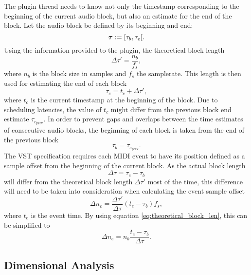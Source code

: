 The plugin thread needs to know not only
the timestamp corresponding to the beginning of the current audio block,
but also an estimate for the end of the block.
Let the audio block be defined by its beginning and end:
\[
\boldsymbol{\tau} := [\tau_b, \tau_e[.
\]
Using the information provided to the plugin,
the theoretical block length
\begin{equation}
\label{eq:theoretical_block_len}
\Delta \tau' = \frac{n_b}{f_s},
\end{equation}
where $n_b$ is the block size in samples and $f_s$ the samplerate.
This length is then used for estimating the end of each block
\begin{equation}
\tau_e = t_c + \Delta \tau',
\end{equation}
where $t_c$ is the current timestamp at the beginning of the block.
Due to scheduling latencies,
the value of $t_c$ might differ from the
previous block end estimate $\tau_{e_{\mathrm{prev}}}$.
In order to prevent gaps and overlaps between the
time estimates of consecutive audio blocks,
the beginning of each block is taken from the end of the previous block
\begin{equation}
\tau_b = \tau_{e_{\mathrm{prev}}}.
\end{equation}
The VST specification requires
each MIDI event to have its position defined
as a sample offset from the beginning of the current block.
As the actual block length
\begin{equation}
\Delta \tau = \tau_e - \tau_b
\end{equation}
will differ from the theoretical block length
$\Delta \tau'$ most of the time,
this difference will need to be taken into consideration
when calculating the event sample offset
\begin{equation}
\Delta n_e = \frac{\Delta \tau'}{\Delta \tau} (t_e - \tau_b) f_s,
\end{equation}
where $t_e$ is the event time. By using equation \ref{eq:theoretical_block_len},
this can be simplified to
\begin{equation}
\Delta n_e = n_b \frac{t_e - \tau_b}{\Delta \tau}.
\end{equation}

\subsection{Dimensional Analysis}

